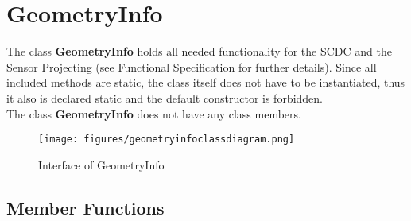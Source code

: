 \section{GeometryInfo}

The class \textbf{GeometryInfo} holds all needed functionality for the SCDC and the Sensor Projecting (see Functional Specification for further details). Since all included methods are static, the class itself does not have to be instantiated, thus it also is declared static and the default constructor is forbidden.\\
The class \textbf{GeometryInfo} does not have any class members.

\begin{figure}[h]
	\begin{center}
		\texttt{[image: figures/geometryinfoclassdiagram.png]}
		\caption{Interface of GeometryInfo}
	\end{center}
\end{figure}

\subsection{Member Functions}

